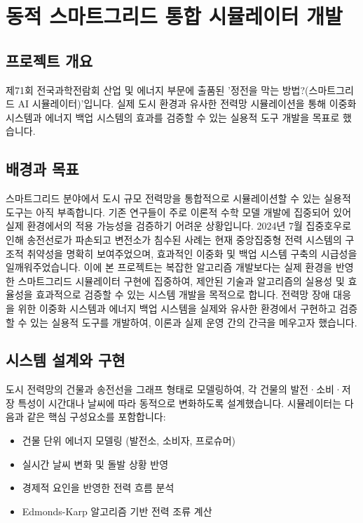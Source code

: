 \section{동적 스마트그리드 통합 시뮬레이터 개발}

\subsection{프로젝트 개요}
 제71회 전국과학전람회 산업 및 에너지 부문에 출품된 '정전을 막는 방법?(스마트그리드 AI 시뮬레이터)'입니다. 실제 도시 환경과 유사한 전력망 시뮬레이션을 통해 이중화 시스템과 에너지 백업 시스템의 효과를 검증할 수 있는 실용적 도구 개발을 목표로 했습니다. 

\subsection{배경과 목표}
스마트그리드 분야에서 도시 규모 전력망을 통합적으로 시뮬레이션할 수 있는 실용적 도구는 아직 부족합니다. 기존 연구들이 주로 이론적 수학 모델 개발에 집중되어 있어 실제 환경에서의 적용 가능성을 검증하기 어려운 상황입니다. 2024년 7월 집중호우로 인해 송전선로가 파손되고 변전소가 침수된 사례는 현재 중앙집중형 전력 시스템의 구조적 취약성을 명확히 보여주었으며, 효과적인 이중화 및 백업 시스템 구축의 시급성을 일깨워주었습니다. 
이에 본 프로젝트는 복잡한 알고리즘 개발보다는 실제 환경을 반영한 스마트그리드 시뮬레이터 구현에 집중하여, 제안된 기술과 알고리즘의 실용성 및 효율성을 효과적으로 검증할 수 있는 시스템 개발을 목적으로 합니다. 전력망 장애 대응을 위한 이중화 시스템과 에너지 백업 시스템을 실제와 유사한 환경에서 구현하고 검증할 수 있는 실용적 도구를 개발하여, 이론과 실제 운영 간의 간극을 메우고자 했습니다.

\subsection{시스템 설계와 구현}
도시 전력망의 건물과 송전선을 그래프 형태로 모델링하여, 각 건물의 발전·소비·저장 특성이 시간대나 날씨에 따라 동적으로 변화하도록 설계했습니다. 시뮬레이터는 다음과 같은 핵심 구성요소를 포함합니다:

\begin{itemize}[itemsep=0pt]
    \item 건물 단위 에너지 모델링 (발전소, 소비자, 프로슈머)
    \item 실시간 날씨 변화 및 돌발 상황 반영
    \item 경제적 요인을 반영한 전력 흐름 분석
    \item Edmonds-Karp 알고리즘 기반 전력 조류 계산
\end{itemize}

